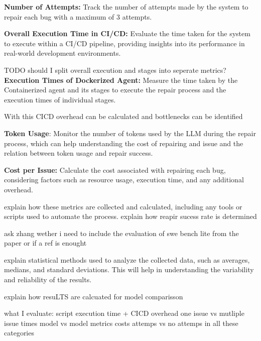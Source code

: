 \textbf{Number of Attempts:} Track the number of attempts made by the system to repair each bug with a maximum of 3 attempts.


\textbf{Overall Execution Time in CI/CD:} Evaluate the time taken for the system to execute within a CI/CD pipeline, providing insights into its performance in real-world development environments.


TODO should I split overall execution and stages into seperate metrics?
\textbf{Execution Times of Dockerized Agent:} Measure the time taken by the Containerized agent and its stages to execute the repair process and the  execution times of individual stages. 

With this CICD overhead can be calculated and bottlenecks can be identified


\textbf{Token Usage}: Monitor the number of tokens used by the LLM during the repair process, which can help understanding the cost of repairing and issue and the relation between token usage and repair success.


\textbf{Cost per Issue:} Calculate the cost associated with repairing each bug, considering factors such as resource usage, execution time, and any additional overhead.


explain how these metrics are collected and calculated, including any tools or scripts used to automate the process.
explain how reapir sucess rate is determined

ask zhang wether i need to include the evaluation of swe bench lite from the paper or if a ref is enought

explain statistical methods used to analyze the collected data, such as averages, medians, and standard deviations. This will help in understanding the variability and reliability of the results.

explain how resuLTS are calcuated for model comparisson

what I evaluate:
script execution time + CICD overhead
one issue vs mutliple issue times
model vs model metrics
costs
attemps vs no attemps in all these categories